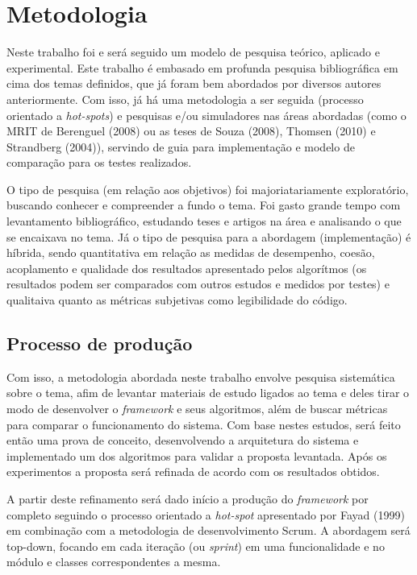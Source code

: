 \chapter[Metodologia]{Metodologia}

Neste trabalho foi e será seguido um modelo de pesquisa teórico, aplicado e experimental. Este trabalho é embasado em profunda pesquisa bibliográfica em cima dos temas definidos, que já foram bem abordados por diversos autores anteriormente. Com isso, já há uma metodologia a ser seguida (processo orientado a \textit{hot-spots}) e pesquisas e/ou simuladores nas áreas abordadas (como o MRIT de Berenguel (2008) ou as teses de Souza (2008), Thomsen (2010) e Strandberg (2004)), servindo de guia para implementação e modelo de comparação para os testes realizados.

O tipo de pesquisa (em relação aos objetivos) foi majoriatariamente exploratório, buscando conhecer e compreender a fundo o tema. Foi gasto grande tempo com levantamento bibliográfico, estudando teses e artigos na área e analisando o que se encaixava no tema. Já o tipo de pesquisa para a abordagem (implementação) é híbrida, sendo quantitativa em relação as medidas de desempenho, coesão, acoplamento e qualidade dos resultados apresentado pelos algorítmos (os resultados podem ser comparados com outros estudos e medidos por testes) e qualitaiva quanto as métricas subjetivas como legibilidade do código.

\section{Processo de produção}

Com isso, a metodologia abordada neste trabalho envolve pesquisa sistemática sobre o tema, afim de levantar materiais de estudo ligados ao tema e deles tirar o modo de desenvolver o \textit{framework} e seus algoritmos, além de buscar métricas para comparar o funcionamento do sistema. Com base nestes estudos, será feito então uma prova de conceito, desenvolvendo a arquitetura do sistema e implementado um dos algoritmos para validar a proposta levantada. Após os experimentos a proposta será refinada de acordo com os resultados obtidos.

A partir deste refinamento será dado início a produção do \textit{framework} por completo seguindo o processo orientado a \textit{hot-spot} apresentado por Fayad (1999) em combinação com a metodologia de desenvolvimento Scrum. A abordagem será top-down, focando em cada iteração (ou \textit{sprint}) em uma funcionalidade e no módulo e classes correspondentes a mesma. 

